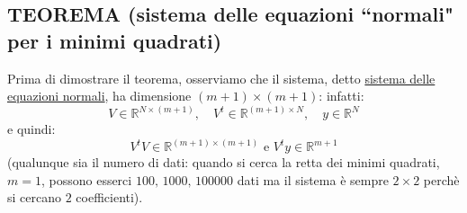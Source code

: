 \documentclass[12pt,a4paper]{article}
\begin{document}
\subsection{TEOREMA (sistema delle equazioni ``normali" per i minimi quadrati)}
\begin{center}
\end{center}
Prima di dimostrare il teorema, osserviamo che il sistema, detto \uline{sistema delle equazioni normali}, ha dimensione $(m+1) \times  (m+1)$: infatti:
\[
	V \in \mathbb{R}^{N \times (m+1)}, \quad V^t \in \mathbb{R}^{(m+1) \times N}, \quad y \in \mathbb{R}^{N}
\]
e quindi:
\[
	V^tV \in \mathbb{R}^{(m+1) \times (m+1)} \text{ e } V^ty \in \mathbb{R}^{m+1}
\]
(qualunque sia il numero di dati: quando si cerca la retta dei minimi quadrati, $m=1$, possono esserci $100, \, 1000, \, 100000$ dati ma il sistema è sempre $2 \times 2$ perchè si cercano $2$ coefficienti).
\end{document}
